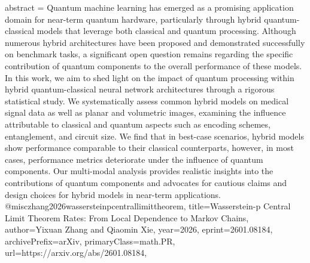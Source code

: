 {      abstract = {Quantum machine learning has emerged as a promising application domain for near-term quantum hardware, particularly through hybrid quantum-classical models that leverage both classical and quantum processing. Although numerous hybrid architectures have been proposed and demonstrated successfully on benchmark tasks, a significant open question remains regarding the specific contribution of quantum components to the overall performance of these models. In this work, we aim to shed light on the impact of quantum processing within hybrid quantum-classical neural network architectures through a rigorous statistical study. We systematically assess common hybrid models on medical signal data as well as planar and volumetric images, examining the influence attributable to classical and quantum aspects such as encoding schemes, entanglement, and circuit size. We find that in best-case scenarios, hybrid models show performance comparable to their classical counterparts, however, in most cases, performance metrics deteriorate under the influence of quantum components. Our multi-modal analysis provides realistic insights into the contributions of quantum components and advocates for cautious claims and design choices for hybrid models in near-term applications.}
}@misc{zhang2026wassersteinpcentrallimittheorem,
      title={Wasserstein-p Central Limit Theorem Rates: From Local Dependence to Markov Chains}, 
      author={Yixuan Zhang and Qiaomin Xie},
      year={2026},
      eprint={2601.08184},
      archivePrefix={arXiv},
      primaryClass={math.PR},
      url={https://arxiv.org/abs/2601.08184},
}
